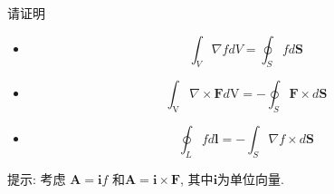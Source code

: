 \documentclass[11pt]{article}
\begin{document}
\vspace{0.5cm}

\begin{hwproblem}{}
请证明
\begin{itemize}
  \item [(1)] $$
\int_V \nabla f d V=\oint_S f d \mathbf{S}
$$
  \item [(2)] $$
  \int_{\mathrm{V}} \nabla \times \mathbf{F} d \mathrm{V}=-\oint_S \mathbf{F} \times d\mathbf{S}$$
  \item [(3)] $$\oint_L f d\mathbf{l}=-\int_S \nabla f \times d\mathbf{S}$$
\end{itemize}
提示: 考虑 $\mathbf{A} = \mathbf{i} f$ 和$\mathbf{A} = \mathbf{i} \times \mathbf{F}$,
其中$\mathbf{i}$为单位向量.
\end{hwproblem}

\vspace{0.5cm}
   



  



  
  








\hwrequirements
\end{document}
